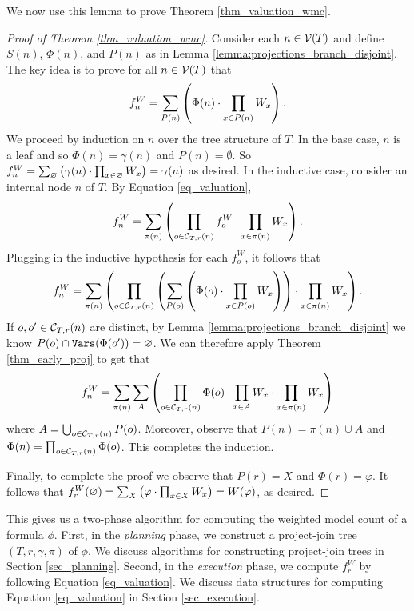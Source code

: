 We now use this lemma to prove Theorem \ref{thm_valuation_wmc}.
\begin{proof}[Proof of Theorem \ref{thm_valuation_wmc}]
Consider each $n \in \mathcal{V}(T)$ and define $S(n)$, $\Phi(n)$, and $P(n)$ as in Lemma \ref{lemma:projections_branch_disjoint}. The key idea is to prove for all $n \in \mathcal{V}(T)$ that 
$$f^W_n = \sum_{P(n)} \left(  \Phi(n) \cdot \prod_{x \in P(n)} W_x  \right) \label{eqn:valuation:correctness}.$$
We proceed by induction on $n$ over the tree structure of $T$. In the base case, $n$ is a leaf and so $\Phi(n) = \gamma(n)$ and $P(n) = \emptyset$. So $f^W_n = \sum_{\varnothing} \left(  \gamma(n) \cdot \prod_{x \in \varnothing} W_x  \right) = \gamma(n)$ as desired. In the inductive case, consider an internal node $n$ of $T$. By Equation \ref{eq_valuation}, $$f^W_n = \sum_{\pi(n)} \left( \prod_{o \in \mathcal{C}_{T,r}(n)} f^W_o \cdot \prod_{x \in \pi(n)} W_x \right).$$
Plugging in the inductive hypothesis for each $f^W_o$, it follows that
$$f^W_n = \sum_{\pi(n)} \left( \prod_{o \in \mathcal{C}_{T,r}(n)} \left( \sum_{P(o)} \left(  \Phi(o) \cdot \prod_{x \in P(o)} W_{x}  \right)  \right) \cdot \prod_{x \in \pi(n)} W_{x} \right).$$
If $o, o' \in \mathcal{C}_{T,r}(n)$ are distinct, by Lemma \ref{lemma:projections_branch_disjoint} we know $P(o) \cap \texttt{\upshape Vars}(\Phi(o')) = \varnothing$. We can therefore apply Theorem \ref{thm_early_proj} to get that
$$f^W_n = \sum_{\pi(n)} \sum_{A} \left(  \prod_{o \in \mathcal{C}_{T,r}(n)} \Phi(o) \cdot \prod_{x \in A} W_{x} \cdot \prod_{x \in \pi(n)} W_{x}  \right)$$
where $A = \bigcup_{o \in \mathcal{C}_{T,r}(n)} P(o)$. Moreover, observe that $P(n) = \pi(n) \cup A$ and $\Phi(n) = \prod_{o \in \mathcal{C}_{T,r}(n)} \Phi(o)$. This completes the induction.

Finally, to complete the proof we observe that $P(r) = X$ and $\Phi(r) = \varphi$. It follows that $f^W_r(\varnothing) = \sum_X \left(  \varphi \cdot \prod_{x \in X} W_x  \right) = W(\varphi)$, as desired.
\end{proof}

This gives us a two-phase algorithm for computing the weighted model count of a formula $\phi$.
First, in the \emph{planning} phase, we construct a project-join tree $(T, r, \gamma, \pi)$ of $\phi$.
We discuss algorithms for constructing project-join trees in Section \ref{sec_planning}.
Second, in the \emph{execution} phase, we compute $f^W_r$ by following Equation \eqref{eq_valuation}.
We discuss data structures for computing Equation \eqref{eq_valuation} in Section \ref{sec_execution}.

